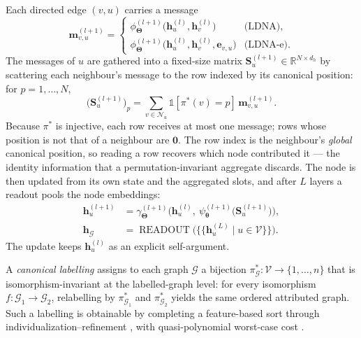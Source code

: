 Each directed edge $(v,u)$ carries a message
\begin{equation}
  \mathbf{m}_{v,u}^{(l+1)}=
  \begin{cases}
    \phi_{\bm{\Theta}}^{(l+1)}\!\big(\mathbf{h}_u^{(l)},\mathbf{h}_v^{(l)}\big) & \text{(LDNA),}\\[2pt]
    \phi_{\bm{\Theta}}^{(l+1)}\!\big(\mathbf{h}_u^{(l)},\mathbf{h}_v^{(l)},\mathbf{e}_{v,u}\big) & \text{(LDNA-e).}
  \end{cases}
  \label{eqn:expr-message}
\end{equation}
The messages of $u$ are gathered into a fixed-size matrix
$\mathbf{S}_u^{(l+1)}\in\mathbb{R}^{N\times d_h}$ by scattering each neighbour's
message to the row indexed by its canonical position: for $p=1,\dots,N$,
\begin{equation}
  \big(\mathbf{S}_u^{(l+1)}\big)_p=\sum_{v\in\mathcal{N}_u}\mathbb{1}\!\left[\pi^*(v)=p\right]\,\mathbf{m}_{v,u}^{(l+1)} .
  \label{eqn:expr-stack}
\end{equation}
Because $\pi^*$ is injective, each row receives at most one message; rows whose
position is not that of a neighbour are $\mathbf{0}$. The row index is the
neighbour's \emph{global} canonical position, so reading a row recovers which
node contributed it --- the identity information that a permutation-invariant
aggregate discards. The node is then updated from its own state and the
aggregated slots, and after $L$ layers a readout pools the node embeddings:
\begin{align}
  \mathbf{h}_u^{(l+1)} &= \gamma_{\bm{\Theta}}^{(l+1)}\!\Big(\mathbf{h}_u^{(l)},\ \psi_{\bm{\theta}}^{(l+1)}\!\big(\mathbf{S}_u^{(l+1)}\big)\Big),
  \label{eqn:expr-update}\\
  \mathbf{h}_{\mathcal{G}} &= \operatorname{READOUT}\big(\{\!\{\mathbf{h}_u^{(L)}\mid u\in\mathcal{V}\}\!\}\big).
  \label{eqn:expr-readout}
\end{align}
The update  keeps $\mathbf{h}_u^{(l)}$ as an explicit
self-argument.

\begin{definition}
\label{def:expr-canonical}
A \emph{canonical labelling} assigns to each graph $\mathcal{G}$ a bijection
$\pi^*_{\mathcal{G}}:\mathcal{V}\to\{1,\dots,n\}$ that is isomorphism-invariant at
the labelled-graph level: for every isomorphism $f:\mathcal{G}_1\to\mathcal{G}_2$,
relabelling by $\pi^*_{\mathcal{G}_1}$ and $\pi^*_{\mathcal{G}_2}$ yields the same
ordered attributed graph. Such a labelling is obtainable by completing a
feature-based sort through individualization--refinement \citep{McKay2014Nauty},
with quasi-polynomial worst-case cost \citep{Babai2016GI}.
\end{definition}

